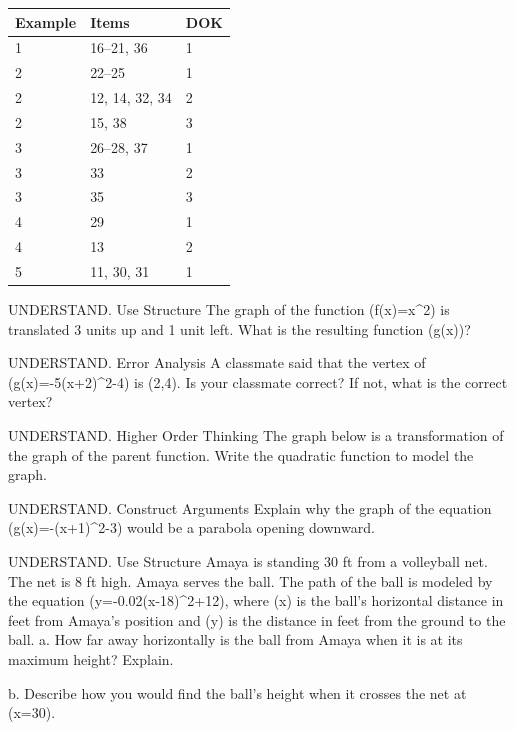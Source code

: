 \documentclass{article}
\newenvironment{item-analysis}{}{}      %
\newenvironment{practice}[2]{}{}        %
\newcommand{\answer}[1]{}               %
\newcommand{\placeholder}[2]{}          %
\begin{document}
\begin{item-analysis}
\begin{tabular}{lll}
\toprule
Example & Items & DOK \\
\midrule
1 & 16--21, 36 & 1 \\
2 & 22--25 & 1 \\
2 & 12, 14, 32, 34 & 2 \\
2 & 15, 38 & 3 \\
3 & 26--28, 37 & 1 \\
3 & 33 & 2 \\
3 & 35 & 3 \\
4 & 29 & 1 \\
4 & 13 & 2 \\
5 & 11, 30, 31 & 1 \\
\bottomrule
\end{tabular}
\end{item-analysis}
\begin{practice}{11}{1}
UNDERSTAND. Use Structure The graph of the function (f(x)=x^2) is translated 3 units up and 1 unit left. What is the resulting function (g(x))?
\answer{(g(x)=(x+1)^2+3)}
\end{practice}
\begin{practice}{12}{2}
UNDERSTAND. Error Analysis A classmate said that the vertex of (g(x)=-5(x+2)^2-4) is (2,4). Is your classmate correct? If not, what is the correct vertex?
\answer{No, the correct vertex is (-2,-4). The classmate should rewrite the function as (g(x)=-5(x-(-2))^2-4) to see the signs for the values of the vertex (h,k).}
\end{practice}
\begin{practice}{13}{2}
UNDERSTAND. Higher Order Thinking The graph below is a transformation of the graph of the parent function. Write the quadratic function to model the graph.
\placeholder{graph}{Practice 13: red downward parabola, closed vertex labeled (-3,4), branches with arrows at bottom near (-5.2,-6) and (-0.8,-6). Gray x,y axes, unit grid window x=-9 to 3,y=-6 to 6; x labels -8,-6,-4,-2,2, O at origin; y labels -4,-2,2,4. Curve y=-2(x+3)^2+4.}
\answer{(y=-2(x+3)^2+4)}
\end{practice}
\begin{practice}{14}{2}
UNDERSTAND. Construct Arguments Explain why the graph of the equation (g(x)=-(x+1)^2-3) would be a parabola opening downward.
\answer{Since (a=-1) and (-1<0), the parabola opens downward.}
\end{practice}
\begin{practice}{15}{3}
UNDERSTAND. Use Structure Amaya is standing 30 ft from a volleyball net. The net is 8 ft high. Amaya serves the ball. The path of the ball is modeled by the equation (y=-0.02(x-18)^2+12), where (x) is the ball's horizontal distance in feet from Amaya's position and (y) is the distance in feet from the ground to the ball.
a. How far away horizontally is the ball from Amaya when it is at its maximum height? Explain.
\answer{a. The ball is 18 ft away from Amaya when it is at its maximum height. Use the (x)-coordinate of the vertex.}
b. Describe how you would find the ball's height when it crosses the net at (x=30).
\answer{Substitute 30 for the variable (x) in the equation. The ball's height is 9.12 ft.}
\end{practice}
\end{document}
